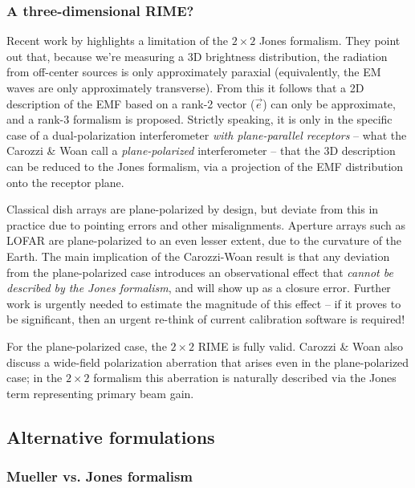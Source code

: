 \documentclass[]{aa}
\begin{document}
\subsubsection{A three-dimensional RIME?\label{sec:3D-rime}}

Recent work by \citet{Carozzi:ME3D} highlights a limitation of the $2\times2$ Jones formalism. They point out that,  because we're measuring a 3D brightness distribution, the radiation from off-center sources is only approximately paraxial (equivalently, the EM waves are only approximately transverse). From this it follows that a 2D description 
of the EMF based on a rank-2  vector ($\vec e$) can only be approximate, and a rank-3 formalism is proposed. 
Strictly speaking, it is only in the specific case of a dual-polarization interferometer {\em with plane-parallel receptors} -- what the Carozzi \& Woan  call a {\em plane-polarized} interferometer -- that the 3D description can be reduced to the Jones formalism, via a projection of the EMF distribution onto the receptor plane. 

Classical dish arrays are plane-polarized by design, but deviate from this in practice due to pointing errors and other misalignments. Aperture arrays such as LOFAR are plane-polarized to an even lesser extent, due to the curvature of the Earth. The main implication of the Carozzi-Woan result is that any deviation from the plane-polarized case introduces an observational effect that {\em cannot be described by the Jones formalism}, and will show up as a closure error. Further work is urgently needed to estimate the magnitude of this effect -- if it proves to be significant, then an urgent re-think of current calibration software is required!

For the plane-polarized case, the $2\times2$ RIME is fully valid. Carozzi \& Woan also discuss a wide-field polarization aberration that arises even in the plane-polarized case; in the $2\times2$ formalism this aberration  is naturally described via the Jones term representing primary beam gain.

\subsection{\label{sec:formulations}Alternative formulations}

\subsubsection{Mueller vs. Jones formalism}
\end{document}
